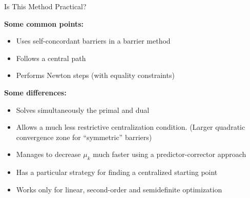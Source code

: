 \documentclass[9pt]{beamer}
\begin{document}
\begin{frame}{Is This Method Practical?}


  \vfill
  
  \textbf{Some common points:}
  \begin{itemize}
  \item Uses self-concordant barriers in a barrier method
  \item Follows a central path
  \item Performs Newton steps (with equality constraints)
  \end{itemize}

  \vfill

  \textbf{Some differences:}
  \begin{itemize}
  \item Solves simultaneously the primal and dual
  \item Allows a much less restrictive centralization condition. (Larger quadratic convergence zone for ``symmetric'' barriers)
  \item Manages to decrease $\mu_k$ much faster using a predictor-corrector approach
  \item Has a particular strategy for finding a centralized starting point
  \item Works only for linear, second-order and semidefinite optimization
  \end{itemize}
  
\end{frame}
\end{document}
